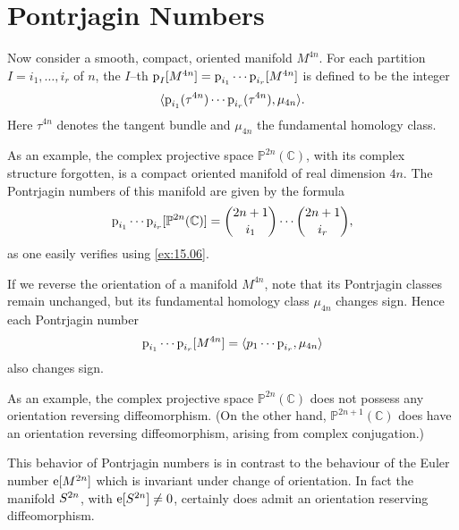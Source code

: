 \documentclass[../main]{subfiles}
\begin{document}
\section{Pontrjagin Numbers}
Now consider a smooth, compact, oriented manifold $M^{4n}$. For each partition $I = i_1, \ldots, i_r$ of $n$, the $I$--th  $\operatorname{p}_I[M^{4n}] = \operatorname{p}_{i_1} \cdots \operatorname{p}_{i_r} [M^{4n}]$ is defined to be the integer \[\langle\operatorname{p}_{i_1} (\tau^{4n}) \cdots \operatorname{p}_{i_r}(\tau^{4n}),\mu_{4n}\rangle.\] Here $\tau^{4n}$ denotes the tangent bundle and $\mu_{4n}$ the fundamental homology class. 

As an example, the complex projective space ${\mathbb P}^{2n}(\mathbb C)$, with its complex structure forgotten, is a compact oriented manifold of real dimension $4 n$. The Pontrjagin numbers of this manifold are given by the formula \[\operatorname{p}_{i_1} \cdots \operatorname{p}_{i_r} [{\mathbb P}^{2n}(\mathbb C)] = \binom {2n + 1} {i_1} \cdots \binom {2n + 1} {i_r},\] as one easily verifies using \ref{ex:15.06}. 

If we reverse the orientation of a manifold $M^{4n}$, note that its Pontrjagin classes remain unchanged, but its fundamental homology class $\mu_{4n}$ changes sign. Hence each Pontrjagin number \[\operatorname{p}_{i_1} \cdots \operatorname{p}_{i_r} [M^{4n}] = \langle p_1 \cdots \operatorname{p}_{i_r},\mu_{4n}\rangle\] also changes sign.  

As an example, the complex projective space ${\mathbb P}^{2n}(\mathbb C)$ does not possess any orientation reversing diffeomorphism. (On the other hand, ${\mathbb P}^{2n + 1}(\mathbb C)$ does have an orientation reversing diffeomorphism, arising from complex conjugation.) 

This behavior of Pontrjagin numbers is in contrast to the behaviour of the Euler number $\operatorname{e}[M^{2n}]$ which is invariant under change of orientation. In fact the manifold $S^{2n}$, with $\operatorname{e}[S^{2n}] \ne 0$, certainly does admit an orientation reserving diffeomorphism. 
\end{document}
